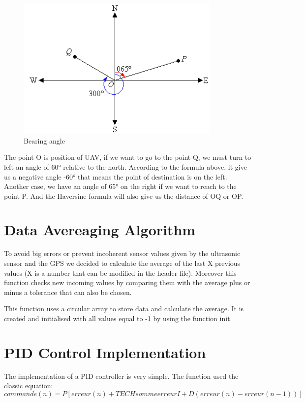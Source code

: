 \begin{figure}[!h] 
\begin{center}
\includegraphics[width=10cm]{imgs/img.png}
\caption{Bearing angle} 
\label{img1} 
\end{center}
\end{figure} 

The point O is position of UAV, if we want to go to the point Q, we must turn to left an angle of 60° relative to the north. According to the formula above, it give us a negative angle -60° that means the point of destination is on the left. Another case, we have an angle of 65° on the right if we want to reach to the point P.
And the Haversine formula will also give us the distance of OQ or OP.

\section{Data Avereaging Algorithm}

To avoid big errors or prevent incoherent sensor values given by the ultrasonic sensor and the GPS we decided to calculate the average of the last X previous values (X is a number that can be modified in the header file). Moreover this function checks new incoming values by comparing them with the average plus or minus a tolerance that can also be chosen.

This function uses a circular array to store data and calculate the average. It is created and initialised with all values equal to -1 by using the function init.

\section{PID Control Implementation}
The implementation of a PID controller is very simple. The function used the classic equation:
\begin{equation}
commande(n) = P[erreur(n)+TECHsommeerreurI+D(erreur(n)-erreur(n-1))]
\end{equation}

